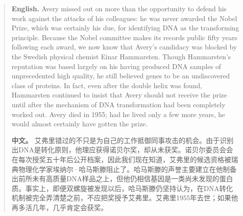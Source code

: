 \begin{quote}
\noindent\textbf{English.} Avery missed out on more than the opportunity to defend his work against the attacks of his colleagues: he was never awarded the Nobel Prize, which was certainly his due, for identifying DNA as the transforming principle. Because the Nobel committee makes its records public fifty years following each award, we now know that Avery's candidacy was blocked by the Swedish physical chemist Einar Hammarsten. Though Hammarsten's reputation was based largely on his having produced DNA samples of unprecedented high quality, he still believed genes to be an undiscovered class of proteins. In fact, even after the double helix was found, Hammarsten continued to insist that Avery should not receive the prize until after the mechanism of DNA transformation had been completely worked out. Avery died in 1955; had he lived only a few more years, he would almost certainly have gotten the prize.

\smallskip
\noindent\textbf{中文。} 艾弗里错过的不只是为自己的工作抵御同事攻击的机会。由于识别出DNA是转化原则，他理应获得诺贝尔奖，却从未获奖。诺贝尔委员会会在每次授奖五十年后公开档案，因此我们现在知道，艾弗里的候选资格被瑞典物理化学家埃纳尔·哈马斯滕阻止了。哈马斯滕的声誉主要建立在他制备出前所未有高质量DNA样品之上，但他仍相信基因是一类尚未发现的蛋白质。事实上，即便双螺旋被发现以后，哈马斯滕仍坚持认为，在DNA转化机制被完全弄清楚之前，不应把奖授予艾弗里。艾弗里1955年去世；如果他再多活几年，几乎肯定会获奖。
\end{quote}

